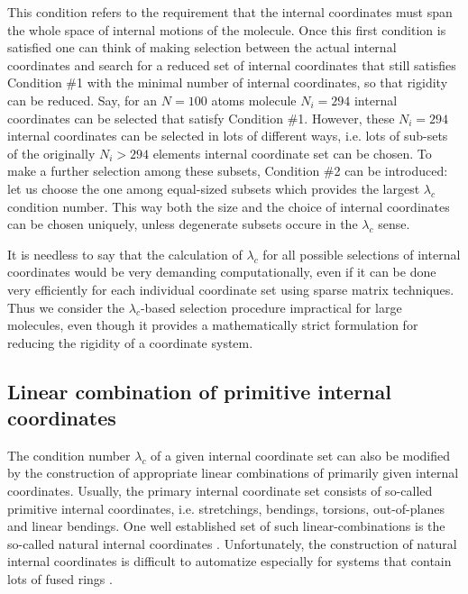 \documentclass[prl,aps,preprint,superbib,12pt]{revtex4}
\begin{document}
This condition refers to the requirement
that the internal coordinates must span the whole space 
of internal motions of the molecule.
Once this first condition is satisfied one can think of making
selection between the actual internal coordinates and search
for a reduced set of internal coordinates that still satisfies 
Condition \#1 with the minimal number of internal coordinates, so that
rigidity can be reduced.
Say, for an $N=100$ atoms molecule $N_{i}=294$ internal coordinates
can be selected that satisfy Condition \#1. However, these $N_{i}=294$
internal coordinates can be selected in lots of different ways,
i.e. lots of sub-sets of the originally $N_{i}>294$ elements internal
coordinate set can be chosen. To make a further selection
among these subsets, Condition \#2 can be introduced:
let us choose the one among equal-sized subsets which provides the
largest $\lambda_{c}$ condition number. This way both
the size and the choice of internal coordinates can be chosen
uniquely, unless degenerate subsets occure in the $\lambda_{c}$ sense.

It is needless to say that the calculation of $\lambda_{c}$
for all possible selections of internal coordinates would be 
very demanding computationally, even if it can be done very efficiently
for each individual coordinate set using sparse matrix techniques.
Thus we consider the $\lambda_{c}$-based
selection procedure impractical for large molecules, even though it
provides a mathematically strict formulation for reducing the rigidity
of a coordinate system.

\subsection{Linear combination of primitive internal coordinates}
The condition number $\lambda_{c}$ of a given internal coordinate set
can also be modified by the construction of appropriate linear 
combinations of primarily given internal coordinates. Usually, the
primary internal coordinate set consists of so-called primitive
internal coordinates, i.e. stretchings, bendings, torsions,
out-of-planes and linear bendings. One well established set of such
linear-combinations is the so-called natural internal coordinates
\cite{GFogarasi92,MvonArnim99}. Unfortunately, the construction
of natural internal coordinates is difficult to 
automatize especially for systems that contain
lots of fused rings \cite{BPaizs00}. 
\end{document}
